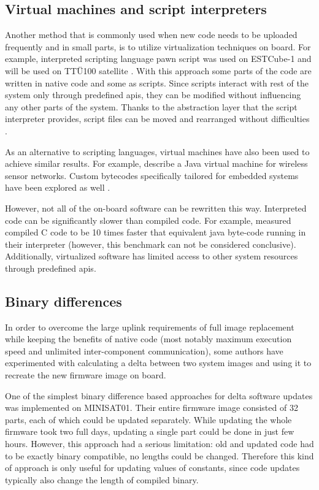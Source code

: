 \subsection{Virtual machines and script interpreters}

Another method that is commonly used when new code needs to be uploaded frequently and in small parts, is to utilize virtualization techniques on board. For example, interpreted scripting language pawn script was used on ESTCube-1 \cite{Suenter2016} and will be used on TTÜ100 satellite \cite{Aasavaeli2017}. With this approach some parts of the code are written in native code and some as scripts. Since scripts interact with rest of the system only through predefined \glspl{api}, they can be modified without influencing any other parts of the system. Thanks to the abstraction layer that the script interpreter provides, script files can be moved and rearranged without difficulties \cite{Riemersma2017}.

As an alternative to scripting languages, virtual machines have also been used to achieve similar results. For example, \textcite{Simon2006} describe a Java virtual machine for wireless sensor networks. Custom bytecodes specifically tailored for embedded systems have been explored as well \cite{Levis2002}.

However, not all of the on-board software can be rewritten this way. Interpreted code can be significantly slower than compiled code. For example, \textcite{Simon2006} measured compiled C code to be 10 times faster that equivalent java byte-code running in their interpreter (however, this benchmark can not be considered conclusive). Additionally, virtualized software has limited access to other system resources through predefined \glspl{api}.

\subsection{Binary differences}

In order to overcome the large uplink requirements of full image replacement while keeping the benefits of native code (most notably maximum execution speed and unlimited inter-component communication), some authors have experimented with calculating a delta between two system images and using it to recreate the new firmware image on board.

One of the simplest binary difference based approaches for delta software updates was implemented on MINISAT01. Their entire firmware image consisted of 32 parts, each of which could be updated separately. While updating the whole firmware took two full days, updating a single part could be done in just few hours. However, this approach had a serious limitation: old and updated code had to be exactly binary compatible, no lengths could be changed. Therefore this kind of approach is only useful for updating values of constants, since code updates typically also change the length of compiled binary. \cite{Garrido1998}

